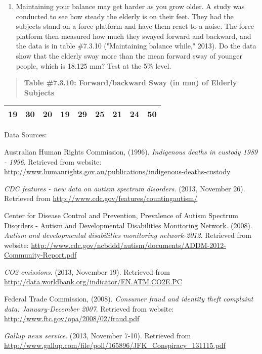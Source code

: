 \documentclass[]{book}
\providecommand{\tightlist}{%
  \setlength{\itemsep}{0pt}\setlength{\parskip}{0pt}}
\begin{document}
\begin{enumerate}
\def\labelenumi{\arabic{enumi}.}
\setcounter{enumi}{7}
\tightlist
\item
  Maintaining your balance may get harder as you grow older. A study
  was conducted to see how steady the elderly is on their feet. They
  had the subjects stand on a force platform and have them react to a
  noise. The force platform then measured how much they swayed forward
  and backward, and the data is in table \#7.3.10 ("Maintaining
  balance while," 2013). Do the data show that the elderly sway more
  than the mean forward sway of younger people, which is 18.125 mm?
  Test at the 5\% level.
\end{enumerate}

\begin{quote}
\textbf{Table \#7.3.10: Forward/backward Sway (in mm) of Elderly Subjects}
\end{quote}

\begin{longtable}[]{@{}lllllllll@{}}
\toprule
\endhead
19 & 30 & 20 & 19 & 29 & 25 & 21 & 24 & 50\tabularnewline
\bottomrule
\end{longtable}

Data Sources:

Australian Human Rights Commission, (1996). \emph{Indigenous deaths in
custody 1989 - 1996}. Retrieved from website:
\url{http://www.humanrights.gov.au/publications/indigenous-deaths-custody}

\emph{CDC features - new data on autism spectrum disorders}. (2013, November
26). Retrieved from \url{http://www.cdc.gov/features/countingautism/}

Center for Disease Control and Prevention, Prevalence of Autism Spectrum
Disorders - Autism and Developmental Disabilities Monitoring Network.
(2008). \emph{Autism and developmental disabilities monitoring network-2012}.
Retrieved from website:
\url{http://www.cdc.gov/ncbddd/autism/documents/ADDM-2012-Community-Report.pdf}

\emph{CO2 emissions}. (2013, November 19). Retrieved from
\url{http://data.worldbank.org/indicator/EN.ATM.CO2E.PC}

Federal Trade Commission, (2008). \emph{Consumer fraud and identity theft
complaint data: January-December 2007}. Retrieved from website:
\url{http://www.ftc.gov/opa/2008/02/fraud.pdf}

\emph{Gallup news service}. (2013, November 7-10). Retrieved from
\url{http://www.gallup.com/file/poll/165896/JFK_Conspiracy_131115.pdf}
\end{document}
